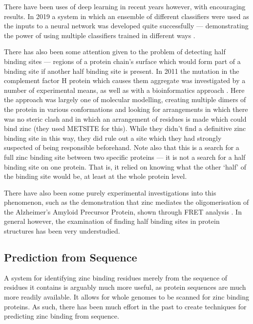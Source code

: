 There have been uses of deep learning in recent years however, with encouraging results. In 2019 a system in which an ensemble of different classifiers were used as the inputs to a neural network was developed quite successfully --- demonstrating the power of using multiple classifiers trained in different ways \cite{li2019}.

There has also been some attention given to the problem of detecting half binding sites --- regions of a protein chain's surface which would form part of a binding site if another half binding site is present. In 2011 the mutation in the complement factor H protein which causes them aggregate was investigated by a number of experimental means, as well as with a bioinformatics approach \cite{nan2011zinc}. Here the approach was largely one of molecular modelling, creating multiple dimers of the protein in various conformations and looking for arrangements in which there was no steric clash and in which an arrangement of residues is made which could bind zinc (they used METSITE for this). While they didn't find a definitive zinc binding site in this way, they did rule out a site which they had strongly suspected of being responsible beforehand. Note also that this is a search for a full zinc binding site between two specific proteins --- it is not a search for a half binding site on one protein. That is, it relied on knowing what the other `half' of the binding site would be, at least at the whole protein level.

There have also been some purely experimental investigations into this phenomenon, such as the demonstration that zinc mediates the oligomerisation of the Alzheimer's Amyloid Precursor Protein, shown through FRET analysis \cite{mayer2014novel}. In general however, the examination of finding half binding sites in protein structures has been very understudied.

\subsection{Prediction from Sequence}

A system for identifying zinc binding residues merely from the sequence of residues it contains is arguably much more useful, as protein sequences are much more readily available. It allows for whole genomes to be scanned for zinc binding proteins. As such, there has been much effort in the past to create techniques for predicting zinc binding from sequence.

